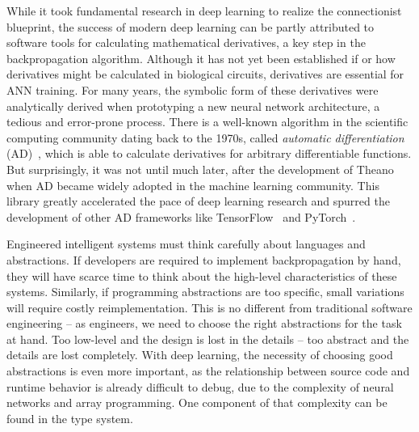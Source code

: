 While it took fundamental research in deep learning to realize the connectionist blueprint, the success of modern deep learning can be partly attributed to software tools for calculating mathematical derivatives, a key step in the backpropagation algorithm. Although it has not yet been established if or how derivatives might be calculated in biological circuits, derivatives are essential for ANN training. For many years, the symbolic form of these derivatives were analytically derived when prototyping a new neural network architecture, a tedious and error-prone process. There is a well-known algorithm in the scientific computing community dating back to the 1970s, called \textit{automatic differentiation} (AD)~\citep{linnainmaa1970representation, griewank1989automatic}, which is able to calculate derivatives for arbitrary differentiable functions. But surprisingly, it was not until much later, after the development of Theano~\citep{bergstra2010theano} when AD became widely adopted in the machine learning community. This library greatly accelerated the pace of deep learning research and spurred the development of other AD frameworks like TensorFlow~\citep{abadi2016tensorflow} and PyTorch~\citep{paszke2019pytorch}.

Engineered intelligent systems must think carefully about languages and abstractions. If developers are required to implement backpropagation by hand, they will have scarce time to think about the high-level characteristics of these systems. Similarly, if programming abstractions are too specific, small variations will require costly reimplementation. This is no different from traditional software engineering -- as engineers, we need to choose the right abstractions for the task at hand. Too low-level and the design is lost in the details -- too abstract and the details are lost completely. With deep learning, the necessity of choosing good abstractions is even more important, as the relationship between source code and runtime behavior is already difficult to debug, due to the complexity of neural networks and array programming. One component of that complexity can be found in the type system.

